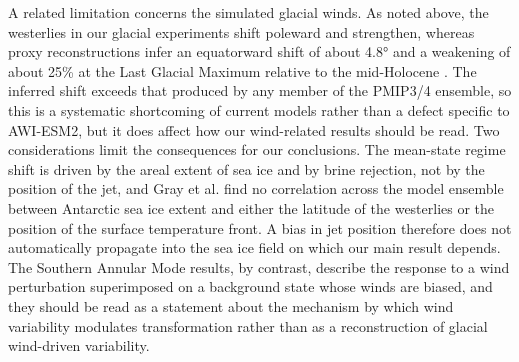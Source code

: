 \documentclass[pdflatex,sn-nature]{sn-jnl}
\begin{document}
A related limitation concerns the simulated glacial winds. As noted above, the westerlies in our glacial experiments shift poleward and strengthen, whereas proxy reconstructions infer an equatorward shift of about 4.8° and a weakening of about 25\% at the Last Glacial Maximum relative to the mid-Holocene \cite{Gray2023}. The inferred shift exceeds that produced by any member of the PMIP3/4 ensemble, so this is a systematic shortcoming of current models rather than a defect specific to AWI-ESM2, but it does affect how our wind-related results should be read. Two considerations limit the consequences for our conclusions. The mean-state regime shift is driven by the areal extent of sea ice and by brine rejection, not by the position of the jet, and Gray et al. \cite{Gray2023} find no correlation across the model ensemble between Antarctic sea ice extent and either the latitude of the westerlies or the position of the surface temperature front. A bias in jet position therefore does not automatically propagate into the sea ice field on which our main result depends. The Southern Annular Mode results, by contrast, describe the response to a wind perturbation superimposed on a background state whose winds are biased, and they should be read as a statement about the mechanism by which wind variability modulates transformation rather than as a reconstruction of glacial wind-driven variability.
\end{document}
